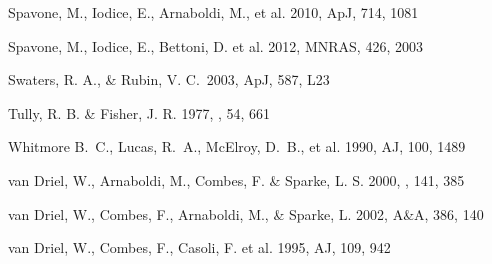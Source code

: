 \documentclass[11pt,twoside]{article}
\begin{document}
\begin{thebibliography}{}
 Spavone, M., 
Iodice, E., Arnaboldi, M., et al. 2010, ApJ, 714, 1081

 Spavone, M., 
Iodice, E., Bettoni, D. et al. 2012, MNRAS, 426, 2003

 Swaters, R. A., 
\& Rubin, V. C.\ 2003, ApJ, 587, L23

 Tully, R. B. \& Fisher, 
J. R. 1977, \aap, 54, 661

 Whitmore B.~C., 
Lucas, R.~A., McElroy, D.~B., et al. 1990, AJ, 100, 1489

 van Driel, W., 
Arnaboldi, M., Combes, F. \& Sparke, L. S. 2000, \aap, 141, 385

 van Driel, W., 
Combes, F., Arnaboldi, M., \& Sparke, L. 2002, A\&A, 386, 140

 van Driel, W., 
Combes, F., Casoli, F. et al. 1995, AJ, 109, 942

\end{thebibliography}
\end{document}

